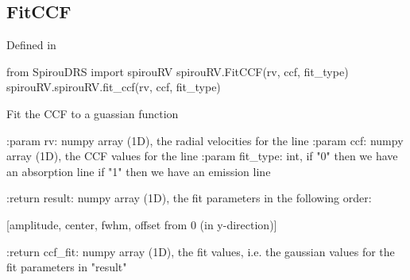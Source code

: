 \noindent\begin{minipage}{\textwidth}
\subsection{FitCCF}

Defined in \spirouRV{}

\begin{pythonbox}
from SpirouDRS import spirouRV
spirouRV.FitCCF(rv, ccf, fit_type)
spirouRV.spirouRV.fit_ccf(rv, ccf, fit_type)
\end{pythonbox}

\begin{pythondocstring}
Fit the CCF to a guassian function

:param rv: numpy array (1D), the radial velocities for the line
:param ccf: numpy array (1D), the CCF values for the line
:param fit_type: int, if "0" then we have an absorption line
                      if "1" then we have an emission line

:return result: numpy array (1D), the fit parameters in the
                following order:

            [amplitude, center, fwhm, offset from 0 (in y-direction)]

:return ccf_fit: numpy array (1D), the fit values, i.e. the gaussian values
                 for the fit parameters in "result"
\end{pythondocstring}
\end{minipage}

